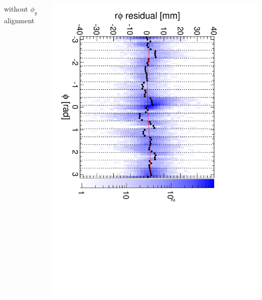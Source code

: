 \documentclass[compress]{beamer}
\begin{document}
\begin{frame}
\begin{columns}
\centering without $\phi_y$ alignment

\includegraphics[height=\linewidth, angle=90]{diskiter02_phiyzero_p2to3.pdf}
\end{columns}
\end{frame}
\end{document}

